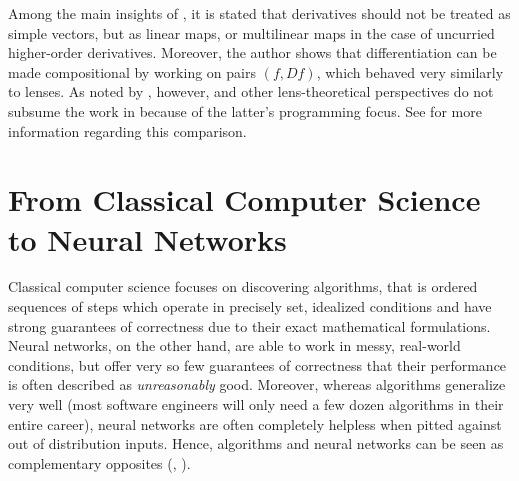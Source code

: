 \documentclass[11pt,a4paper,openright,twoside]{report}
\theoremstyle{plain}
\theoremstyle{definition}
\begin{document}
Among the main insights of \cite{elliott2018simple}, it is stated that derivatives should not be treated as simple vectors, but as linear maps, or multilinear maps in the case of uncurried higher-order derivatives. Moreover, the author shows that differentiation can be made compositional by working on pairs $(f, Df)$, which behaved very similarly to lenses. As noted by \cite{shiebler2021category}, however, \cite{cruttwell2022categorical} and other lens-theoretical perspectives do not subsume the work in \cite{elliott2018simple} because of the latter's programming focus. See \cite{shiebler2021category} for more information regarding this comparison.
































































\chapter{From Classical Computer Science to Neural Networks}


\lhead[\fancyplain{}{\bfseries\thepage}]{\fancyplain{}{\bfseries\rightmark}}




Classical computer science focuses on discovering algorithms, that is ordered sequences of steps which operate in precisely set, idealized conditions and have strong guarantees of correctness due to their exact mathematical formulations. Neural networks, on the other hand, are able to work in messy, real-world conditions, but offer very so few guarantees of correctness that their performance is often described as \textit{unreasonably} good. Moreover, whereas algorithms generalize very well (most software engineers will only need a few dozen algorithms in their entire career), neural networks are often completely helpless when pitted against out of distribution inputs. Hence, algorithms and neural networks can be seen as complementary opposites (\cite{velivckovic2021neural}, \cite{velivckovic2022clrs}).
\end{document}
